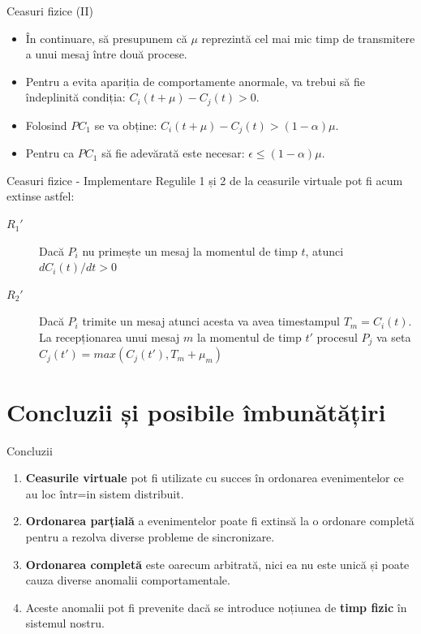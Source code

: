 \documentclass[9pt]{beamer}
\begin{document}
\begin{frame}{Ceasuri fizice (II)}
\begin{itemize}
    \item În continuare, să presupunem că $\mu$ reprezintă cel mai mic timp de transmitere a unui mesaj între două procese.
    \vskip5pt
    \item Pentru a evita apariția de comportamente anormale, va trebui să fie îndeplinită condiția: $C_i(t+\mu)-C_j(t)>0$.
    \vskip5pt
    \item Folosind $PC_1$ se va obține: $C_i(t+\mu)-C_j(t)>(1-\alpha)\mu$.
    \vskip5pt
    \item Pentru ca $PC_1$ să fie adevărată este necesar: $\epsilon\leq(1-\alpha)\mu$.
    \vskip10pt
\end{itemize}
\end{frame}

\begin{frame}{Ceasuri fizice - Implementare}
Regulile 1 și 2 de la ceasurile virtuale pot fi acum extinse astfel:
    \begin{description}
        \item[$R_1'$] Dacă $P_i$ nu primește un mesaj la momentul de timp $t$, atunci $dC_i(t)/dt>0$
        \vskip5pt
        \item[$R_2'$] Dacă $P_i$ trimite un mesaj atunci acesta va avea timestampul $T_m=C_i(t)$. La recepționarea unui mesaj $m$ la momentul de timp $t'$ procesul $P_j$ va seta $C_j(t')=max(C_j(t'),T_m+\mu_m)$
    \end{description}
\end{frame}

\section[]{Concluzii și posibile îmbunătățiri}

\begin{frame}{Concluzii}
\begin{enumerate}
    \item \textbf{Ceasurile virtuale} pot fi utilizate cu succes în ordonarea evenimentelor ce au loc într=in sistem distribuit.
    \vskip5pt
    \item \textbf{Ordonarea parțială} a evenimentelor poate fi extinsă la o ordonare completă pentru a rezolva diverse probleme de sincronizare.
    \vskip5pt
    \item \textbf{Ordonarea completă} este oarecum arbitrată, nici ea nu este unică și poate cauza diverse anomalii comportamentale.
    \item Aceste anomalii pot fi prevenite dacă se introduce noțiunea de \textbf{timp fizic} în sistemul nostru.
\end{enumerate}
\end{frame}
\end{document}
